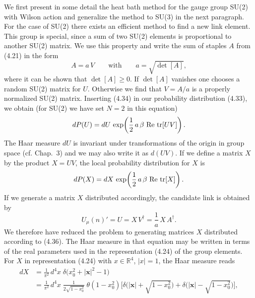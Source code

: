 We first present in some detail the heat bath method for the gauge group
SU(2) with Wilson action and generalize the method to SU(3) in the next
paragraph. For the case of SU(2) there exists an efficient method to find a
new link element. This group is special, since a sum of two SU(2) elements
is proportional to another SU(2) matrix. We use this property and write the
sum of staples $A$ from (4.21) in the form
\begin{equation}
  A = a\,V \qquad \text{with}\qquad a = \sqrt{\det[A]},
\end{equation}
where it can be shown that $\det[A] \geq 0$. If $\det[A]$ vanishes one chooses a random
SU(2) matrix for $U$. Otherwise we find that $V = A/a$ is a properly normalized
SU(2) matrix. Inserting (4.34) in our probability distribution (4.33), we obtain
(for SU(2) we have set $N = 2$ in this equation)
\begin{equation}
  dP(U) = dU\,\exp\!\left(\frac{1}{2}\,a\,\beta\,\operatorname{Re}\,\operatorname{tr}[U V]\right).
\end{equation}
The Haar measure $dU$ is invariant under transformations of the origin in group
space (cf. Chap.~3) and we may also write it as $d(U V)$. If we define a matrix
$X$ by the product $X = U V$, the local probability distribution for $X$ is
\begin{equation}
  dP(X) = dX\,\exp\!\left(\frac{1}{2}\,a\,\beta\,\operatorname{Re}\,\operatorname{tr}[X]\right).
\end{equation}
If we generate a matrix $X$ distributed accordingly, the candidate link is obtained by
\begin{equation}
  U_\mu(n)' = U = X\,V^\dagger = \frac{1}{a}\,X\,A^\dagger .
\end{equation}
We therefore have reduced the problem to generating matrices $X$ distributed according to (4.36). The Haar measure in that equation may be
written in terms of the real parameters used in the representation (4.24) of
the group elements. For $X$ in representation (4.24) with $x \in \mathbb{R}^4$, $|x| = 1$, the
Haar measure reads
\begin{equation}
  \begin{split}
    dX &= \frac{1}{\pi^2}\,d^4x\;\delta\!\big(x_0^2 + |\mathbf{x}|^2 - 1\big) \\
    &= \frac{1}{\pi^2}\,d^4x\;\frac{1}{2\sqrt{1-x_0^2}}\;\theta(1-x_0^2)
       \Big[\delta\!\Big(|\mathbf{x}| + \sqrt{1-x_0^2}\Big) + \delta\!\Big(|\mathbf{x}| - \sqrt{1-x_0^2}\Big)\Big],
  \end{split}
\end{equation}
